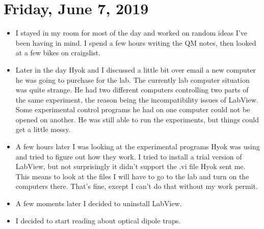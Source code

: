 \documentclass{report}
\theoremstyle{definition}
\begin{document}
\section{Friday, June 7, 2019}
\begin{itemize}
	\item I stayed in my room for most of the day and worked on random ideas I've been having in mind. I spend a few hours writing the QM notes, then looked at a few bikes on craigslist. 
	
	\item Later in the day Hyok and I discussed a little bit over email a new computer he was going to purchase for the lab. The currently lab computer situation was quite strange. He had two different computers controlling two parts of the same experiment, the reason being the incompatibility issues of LabView. Some experimental control programs he had on one computer could not be opened on another. He was still able to run the experiments, but things could get a little messy. 
	
	\item A few hours later I was looking at the experimental programs Hyok was using and tried to figure out how they work. I tried to install a trial version of LabView, but not surprisingly it didn't support the .vi file Hyok sent me. This means to look at the files I will have to go to the lab and turn on the computers there. That's fine, except I can't do that without my work permit.
	
	\item A few moments later I decided to uninstall LabView. 
	
	\item I decided to start reading about optical dipole traps. 
\end{itemize}
\end{document}
